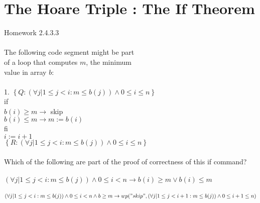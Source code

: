 \documentclass{article}
\author{Krystal Maughan }
\date{April 28th 2017}
\begin{document}
\section{The Hoare Triple : The If Theorem}
Homework 2.4.3.3
\\
\\
The following code segment might be part 
\\
of a loop that computes $m$, the minimum
\\
value in array $b$:
\\
\\
1. $\left\{Q: ( \forall j | 1 \leq j < i : m \leq b (j)) \land 0 \leq i \leq n \right\}$ 
\\
if
\\
$b(i) \geq m \rightarrow $ skip
\\
$b(i) \leq m \rightarrow m := b(i)$
\\
fi
\\
$i := i + 1$
\\
$\left\{R: ( \forall j | 1 \leq j < i : m \leq b (j)) \land 0 \leq i \leq n \right\}$ \\
\\
Which of the following are part of the proof of correctness of this if command?
\\
\\
$( \forall j | 1 \leq j < i : m \leq b (j)) \land 0 \leq i < n \rightarrow b(i) \geq m \vee b(i) \leq m$
\\
\\
$( \forall j | 1 \leq j < i : m \leq b(j)) \land 0 \leq i < n \land b \geq m \rightarrow wp("skip", (\forall j | 1 \leq j < i + 1 : m \leq b(j)) \land 0 \leq i + 1 \leq n)$
\end{document}
